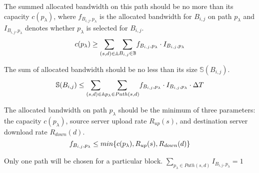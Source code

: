 \begin{packeditemize}
\item The summed allocated bandwidth on this path should be no more than its capacity $c(p_\lambda)$, where $f_{B_{i,j},p_\lambda}$ is the allocated bandwidth for $B_{i,j}$ on path $p_\lambda$ and $I_{B_{i,j},p_\lambda}$ denotes whether $p_\lambda$ is selected for $B_{i,j}$.
\begin{equation}
c(p_\lambda) \geq  \displaystyle{\sum_{(s,d)\in \mathbb{A}}} \displaystyle{\sum_{B_{i,j} \in \mathbb{B}}} f_{B_{i,j},p_\lambda} \cdot I_{B_{i,j},p_\lambda}\\
\end{equation}

\item The sum of allocated bandwidth should be no less than its size $\mathbb{S}(B_{i,j})$.
\begin{equation}
\mathbb{S}(B_{i,j}) \leq  \displaystyle{\sum_{(s,d)\in \mathbb{A}}} \displaystyle{\sum_{p_{\lambda}\in Path(s,d)}} f_{B_{i,j},p_\lambda} \cdot I_{B_{i,j},p_\lambda} \cdot \Delta T\\
\end{equation}

\item The allocated bandwidth on path $p_\lambda$ should be the minimum of three parameters: the capacity $c(p_\lambda)$, source server upload rate $R_{up}(s)$, and destination server download rate $R_{down}(d)$.
\begin{equation}
f_{B_{i,j},p_\lambda} \leq  min \{c(p_\lambda),R_{up}(s),R_{down}(d)\}\\
\end{equation}

\item Only one path will be chosen for a particular block.
$\displaystyle{\sum_{p_\lambda \in Path(s,d)}} I_{B_{i,j},p_\lambda} = 1$
\end{packeditemize}
